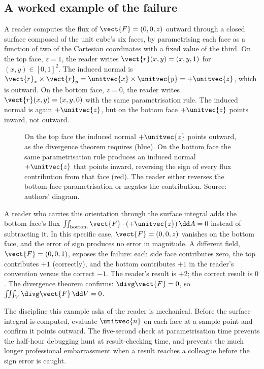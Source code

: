 \subsection{A worked example of the failure}

A reader computes the flux of $\vect{F} = (0, 0, z)$ outward through
a closed surface composed of the unit cube's six faces, by
parametrising each face as a function of two of the Cartesian
coordinates with a fixed value of the third. On the top face,
$z = 1$, the reader writes $\vect{r}(x, y) = (x, y, 1)$ for $(x, y)
\in [0, 1]^{2}$. The induced normal is $\vect{r}_{x} \times
\vect{r}_{y} = \unitvec{x} \times \unitvec{y} = +\unitvec{z}$, which
is outward. On the bottom face, $z = 0$, the reader writes
$\vect{r}(x, y) = (x, y, 0)$ with the same parametrisation rule. The
induced normal is again $+\unitvec{z}$, but on the bottom face
$+\unitvec{z}$ points inward, not outward.

\begin{figure}[h]
  \centering
  
  \caption[Unit-cube orientation trap.]{On the top face the induced
  normal $+\unitvec{z}$ points outward, as the divergence theorem
  requires (blue). On the bottom face the same parametrisation rule
  produces an induced normal $+\unitvec{z}$ that points inward,
  reversing the sign of every flux contribution from that face (red).
  The reader either reverses the bottom-face parametrisation or
  negates the contribution. Source: authors' diagram.}
  \label{fig:vol02:ch08:cube-trap}
\end{figure}

A reader who carries this orientation through the surface integral
adds the bottom face's flux $\iint_{\text{bottom}} \vect{F} \cdot
(+\unitvec{z}) \,\dd A = 0$ instead of subtracting it. In this
specific case, $\vect{F} = (0, 0, z)$ vanishes on the bottom face,
and the error of sign produces no error in magnitude. A different
field, $\vect{F} = (0, 0, 1)$, exposes the failure: each side face
contributes zero, the top contributes $+1$ (correctly), and the
bottom contributes $+1$ in the reader's convention versus the
correct $-1$. The reader's result is $+2$; the correct result is $0$.
The divergence theorem confirms: $\divg\vect{F} = 0$, so
$\iiint_{V} \divg\vect{F} \,\dd V = 0$.

The discipline this example asks of the reader is mechanical. Before
the surface integral is computed, evaluate $\unitvec{n}$ on each face
at a sample point and confirm it points outward. The five-second
check at parametrisation time prevents the half-hour debugging hunt
at result-checking time, and prevents the much longer professional
embarrassment when a result reaches a colleague before the sign
error is caught.

